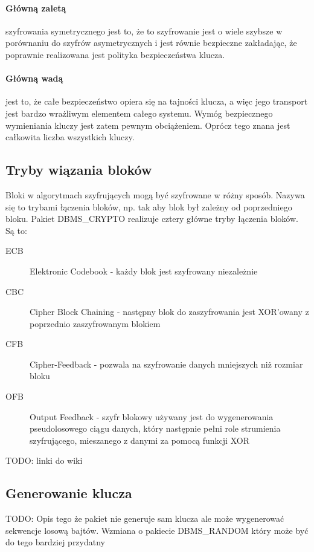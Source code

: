 \documentclass[12pt, a4paper]{article}
\begin{document}
\paragraph{ Główną zaletą} szyfrowania symetrycznego jest to, że to
szyfrowanie jest o wiele szybsze w porównaniu do szyfrów asymetrycznych i
jest równie bezpieczne zakładając, że poprawnie realizowana jest
polityka bezpieczeństwa klucza.


\paragraph{ Główną wadą} jest to, że całe bezpieczeństwo opiera się
na tajności klucza, a więc jego transport jest bardzo wrażliwym
elementem całego systemu. Wymóg bezpiecznego wymieniania kluczy jest
zatem pewnym obciążeniem. Oprócz tego znana jest całkowita liczba
wszystkich kluczy.



\subsection{Tryby wiązania bloków}
Bloki w algorytmach szyfrujących mogą być szyfrowane w różny sposób.
Nazywa się to trybami łączenia bloków, np. tak aby blok był zależny
od poprzedniego bloku. Pakiet DBMS\_CRYPTO realizuje cztery główne tryby
łączenia bloków.
Są to:

\begin{description}
\item[ECB] Elektronic Codebook - każdy blok jest szyfrowany niezależnie
\item[CBC] Cipher Block Chaining - następny blok do zaszyfrowania jest
XOR'owany z poprzednio zaszyfrowanym blokiem
\item[CFB] Cipher-Feedback - pozwala na szyfrowanie danych mniejszych niż
rozmiar bloku
\item[OFB] Output Feedback - szyfr blokowy używany jest do wygenerowania
pseudolosowego ciągu danych, który następnie pełni role strumienia
szyfrującego, mieszanego z danymi za pomocą funkcji XOR
\end{description}

TODO: linki do wiki

\subsection{Generowanie klucza}
TODO: Opis tego że pakiet nie generuje sam klucza ale może wygenerować
sekwencje
 losową bajtów. Wzmiana o pakiecie DBMS\_RANDOM który może być do tego
 bardziej
 przydatny
\end{document}
